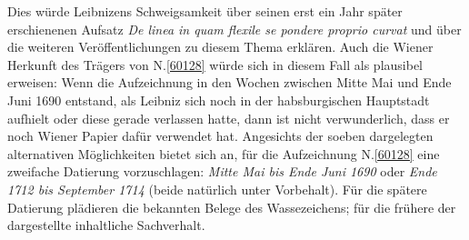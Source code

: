 Dies würde Leibnizens Schweigsamkeit über seinen erst ein Jahr später erschienenen Aufsatz \textit{De linea in quam flexile se pondere proprio curvat}\cite{02033} und über die weiteren Veröffentlichungen zu diesem Thema erklären.
Auch die Wiener Herkunft des Trägers von N.\;\ref{60128} würde sich in diesem Fall als plausibel erweisen:
Wenn die Aufzeichnung in den Wochen zwischen Mitte Mai und Ende Juni 1690 entstand, als Leibniz sich noch in der habsburgischen Hauptstadt aufhielt oder diese gerade verlassen hatte, dann ist nicht verwunderlich, dass er noch Wiener Papier dafür verwendet hat.
\pend%
\pstart%
Angesichts der soeben dargelegten alternativen Möglichkeiten bietet sich an, für die Aufzeichnung N.\;\ref{60128} eine zweifache Datierung vorzuschlagen: \textit{Mitte Mai bis Ende Juni 1690} oder \textit{Ende 1712 bis September 1714} (beide natürlich unter Vorbehalt).
Für die spätere Datierung plädieren die bekannten Belege des Wassezeichens;
für die frühere der dargestellte inhaltliche Sachverhalt.
\pend%
%
\frenchspacing%
\normalsize%
